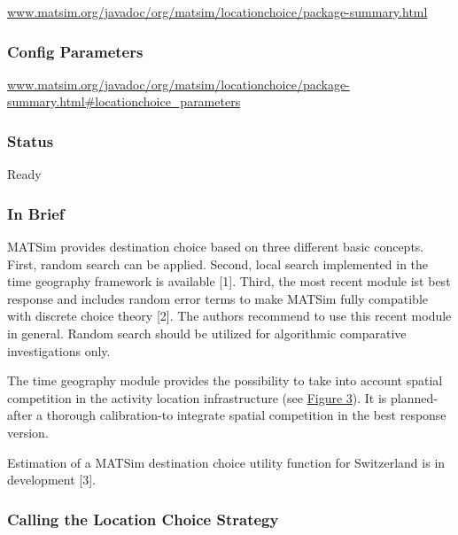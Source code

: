 \documentclass[a4paper,11pt]{report}
\begin{document}
\href{http://www.matsim.org/javadoc/org/matsim/locationchoice/package-summary.html}{www.matsim.org/javadoc/org/matsim/locationchoice/package-summary.html}



\subsubsection{Config Parameters}


\href{http://www.matsim.org/javadoc/org/matsim/locationchoice/package-summary.html#locationchoice_parameters}{www.matsim.org/javadoc/org/matsim/locationchoice/package-summary.html\#locationchoice\_parameters}



\subsubsection{\textbf{Status}}

Ready

\subsubsection{\textbf{In Brief}}

MATSim provides destination choice based on three  different basic concepts. First, random search can be applied. Second,  local search implemented in the time geography framework is available  [1]. Third, the most recent module ist best response and includes random  error terms to make MATSim fully compatible with discrete choice theory  [2]. The authors recommend to use this recent module in general. Random  search should be utilized for algorithmic comparative investigations  only.

The time geography module provides the possibility to  take into account spatial competition in the activity location  infrastructure (see \hyperlink{Figure3}{Figure 3}). It is planned-after a thorough calibration-to integrate spatial competition in the best response version.

Estimation of a MATSim destination choice utility function for Switzerland is in development [3].




\subsubsection{\textbf{Calling the Location Choice Strategy}}
\end{document}
